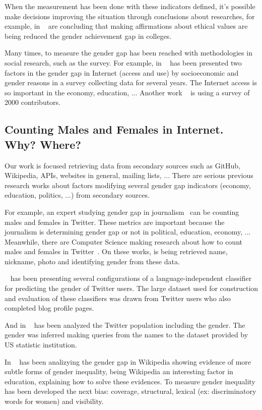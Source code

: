 \documentclass[a4paper]{article}
\begin{document}
When the measurement has been done with these indicators defined, it's
possible make decisions improving the situation through conclusions
about researches, for example, in ~\cite{miyake2010reducing} are
concluding that making affirmations about ethical values are being
reduced the gender achievement gap in colleges.

Many times, to measure the gender gap has been reached with
methodologies in social research, such as the survey. For example, in
~\cite{bimber2000measuring} has been presented two factors in the
gender gap in Internet (access and use) by socioeconomic and gender
reasons in a survey collecting data for several years. The Internet
access is so important in the economy, education, ... Another work
~\cite{10.1007/978-3-319-39225-7_13} is using a survey of 2000
contributors.

\subsection{Counting Males and Females in Internet. Why? Where?}

Our work is focused retrieving data from secondary sources such as
GitHub, Wikipedia, APIs, websites in general, mailing lists, ...
There are serious previous research works about factors modifying
several gender gap indicators (economy, education, politics, ...) from
secondary sources.

For example, an expert studying gender gap in
journalism~\cite{alvarez2012journalism} can be counting males and
females in Twitter. These metrics are important because the journalism
is determining gender gap or not in political, education, economy,
... Meanwhile, there are Computer Science making research about how to
count males and females in Twitter~\cite{burger2011discriminating}. On
these works, is being retrieved name, nickname, photo and identifying
gender from these data.

~\cite{burger2011discriminating} has been presenting several
configurations of a language-independent classifier for predicting the
gender of Twitter users. The large dataset used for construction and
evaluation of these classifiers was drawn from Twitter users who also
completed blog profile pages.

And in ~\cite{mislove2011understanding} has been analyzed the Twitter
population including the gender. The gender was inferred making queries
from the names to the dataset provided by US statistic institution.

In ~\cite{wagner2015s} has been analizying the gender gap in Wikipedia
showing evidence of more subtle forms of gender inequality, being
Wikipedia an interesting factor in education, explaining how to solve
these evidences. To measure gender inequality has been developed the
next bias: coverage, structural, lexical (ex: discriminatory words
for women) and visibility.
\end{document}
